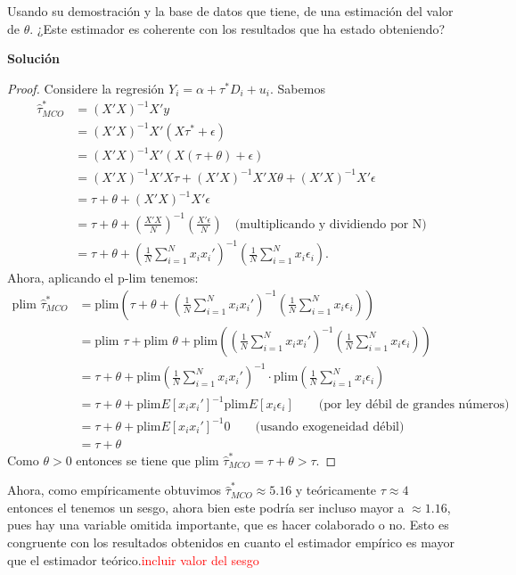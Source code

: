 \documentclass[a4paper, answers, addpoints, 11pt]{exam}
\newenvironment{solucion}{%
  \begin{mdframed}[
    backgroundcolor=blue!5,    %
    linecolor=blue!50,          %
    linewidth=2pt,              %
    leftmargin=10pt,            %
    rightmargin=10pt,           %
    topline=true,              %
    bottomline=true,            %
    roundcorner=10pt,           %
    innerleftmargin=10pt,       %
    innerrightmargin=10pt,      %
    innerbottommargin=10pt,     %
    innertopmargin=10pt         %
  ]%
  \begin{tcolorbox}[colframe=blue!50!black, colback=blue!50, coltitle=white, sharp corners=all, boxrule=1mm, width=\textwidth, halign=left, valign=center, top=0mm, bottom=0mm, left=0mm, right=0mm] \textbf{Solución} \end{tcolorbox} }{\end{mdframed}}
\begin{document}
\begin{itemize}
    Usando su demostración y la base de datos que tiene, de una estimación del valor de $\theta$. ¿Este estimador es coherente con los resultados que ha estado obteniendo?
     \begin{solucion}
       
        \begin{proof}
       Considere la regresión $Y_i =\alpha+ \tau^* D_i + u_i$. Sabemos 
\begin{align*}
    \hat{\tau}^*_{MCO} &=(X'X)^{-1} X' y \\
    &= (X'X)^{-1} X' (X \tau^* + \epsilon) \\
    &= (X'X)^{-1} X' (X (\tau + \theta) + \epsilon) \\
    &= (X'X)^{-1} X' X \tau + (X'X)^{-1} X' X\theta + (X'X)^{-1} X' \epsilon \\
    &= \tau + \theta + (X'X)^{-1} X' \epsilon \\
    &= \tau + \theta + \left( \frac{X'X}{N} \right)^{-1} \left( \frac{X'\epsilon}{N} \right) \quad \text{(multiplicando y dividiendo por N)} \\
    &= \tau + \theta + \left( \frac{1}{N} \sum_{i=1}^{N} x_i x_i' \right)^{-1} \left( \frac{1}{N} \sum_{i=1}^{N} x_i \epsilon_i \right).
  \end{align*}
  Ahora, aplicando el p-lim tenemos:
  \begin{align*}
    \text{plim } \hat{\tau}^*_{MCO} &= \text{plim} \left( \tau + \theta+ \left( \frac{1}{N} \sum_{i=1}^{N} x_i x_i' \right)^{-1} 
    \left( \frac{1}{N} \sum_{i=1}^{N} x_i \epsilon_i \right) \right) \\
    &= \text{plim } \tau + \text{plim } \theta +\text{plim} \left( \left( \frac{1}{N} \sum_{i=1}^{N} x_i x_i' \right)^{-1} 
    \left( \frac{1}{N} \sum_{i=1}^{N} x_i \epsilon_i \right) \right) \\
    &= \tau +\theta+ \text{plim} \left( \frac{1}{N} \sum_{i=1}^{N} x_i x_i' \right)^{-1} 
    \cdot \text{plim} \left( \frac{1}{N} \sum_{i=1}^{N} x_i \epsilon_i \right) \\
      &= \tau +\theta + \text{plim} E[x_i x_i'] ^{-1} \text{plim} E[x_i \epsilon_i] \qquad \text{(por ley débil de grandes números) }\\
      &= \tau +\theta + \text{plim} E[x_i x_i'] ^{-1} 0 \qquad \text{(usando exogeneidad débil) }\\
       &= \tau +\theta
    \end{align*}
   Como $\theta > 0$ entonces se tiene que $\text{plim } \hat{\tau}^*_{MCO}=\tau + \theta >\tau$.
        \end{proof}
        Ahora, como empíricamente obtuvimos $\hat{\tau}^*_{MCO} \approx 5.16$ y teóricamente $\tau \approx 4$ entonces el tenemos un sesgo, ahora bien este podría ser incluso mayor a $\approx 1.16$, pues hay una variable omitida importante, que es hacer colaborado o no.  Esto es congruente con los resultados obtenidos en cuanto el estimador empírico es mayor que el estimador teórico.\textcolor{red}{incluir valor del sesgo}
        \end{solucion}


\end{itemize}
\end{document}
